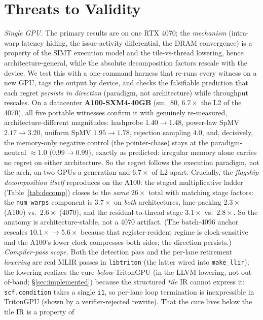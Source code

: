 \documentclass[acmsmall,review,anonymous]{acmart}
\begin{document}
\section{Threats to Validity}
\emph{Single GPU.} The primary results are on one RTX 4070; the \emph{mechanism} (intra-warp latency
hiding, the issue-activity differential, the DRAM convergence) is a property of the SIMT execution model
and the tile-vs-thread lowering, hence architecture-general, while the absolute decomposition factors
rescale with the device. We test this with a one-command harness that re-runs every witness on a new GPU,
tags the output by device, and checks the falsifiable prediction that each regret \emph{persists in
direction} (paradigm, not architecture) while throughput rescales. On a datacenter \textbf{A100-SXM4-40GB}
(sm\_80, $6.7\times$ the L2 of the 4070), all five portable witnesses confirm it with genuinely
re-measured, architecture-different magnitudes: hashprobe $1.40\!\to\!1.48$, power-law SpMV
$2.17\!\to\!3.20$, uniform SpMV $1.95\!\to\!1.78$, rejection sampling $4.0$, and, decisively, the
memory-only negative control (the pointer-chase) stays at the paradigm-neutral $\approx\!1.0$
($0.99\!\to\!0.99$), exactly as predicted: irregular memory alone carries no regret on either
architecture. So the regret follows the execution paradigm, not the arch, on two GPUs a generation and
$6.7\times$ of L2 apart. Crucially, the \emph{flagship decomposition itself} reproduces on the A100: the staged multiplicative ladder (Table~\ref{tab:decomp}) closes to the \emph{same} $26\times$ total with matching stage factors: the \texttt{num\_warps} component is $3.7\times$ on \emph{both} architectures, lane-packing $2.3\times$ (A100) vs.\ $2.6\times$ (4070), and the residual-to-thread stage $3.1\times$ vs.\ $2.8\times$. So the anatomy is architecture-stable, not a 4070 artifact. (The batch-4096 anchor rescales $10.1\times\!\to\!5.6\times$ because that register-resident regime is clock-sensitive and the A100's lower clock compresses both sides; the direction persists.) \emph{Compiler-pass scope.} Both the detection pass and the per-lane
retirement \emph{lowering} are real MLIR passes in \texttt{libtriton} (the latter wired into
\texttt{make\_llir}); the lowering realizes the cure \emph{below} TritonGPU (in the LLVM lowering, not
out-of-band; \S\ref{sec:implemented}) because the structured \emph{tile} IR cannot express it:
\texttt{scf.condition} takes a single \texttt{i1}, so per-lane loop termination is inexpressible in
TritonGPU (shown by a verifier-rejected rewrite). That the cure lives below the tile IR is a property of
\end{document}
